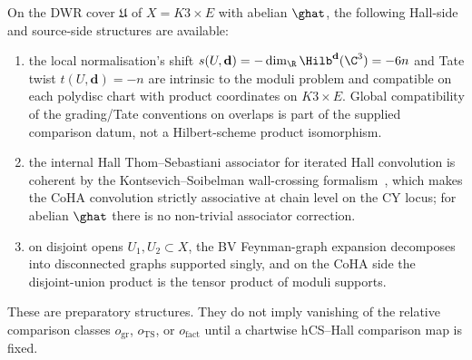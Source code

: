 \begin{proposition}
\label{prop:r6-grading-thom-sebastiani-fact-k3e-inscribed}
On the DWR cover $\mathfrak U$ of $X=K3\times E$ with abelian
$\ghat$, the following Hall-side and source-side structures are
available:
\begin{enumerate}
\item the local normalisation's shift
$s(U,\mathbf d)=-\dim_\R\Hilb^{\mathbf d}(\C^3)=-6n$ and Tate twist
$t(U,\mathbf d)=-n$ are intrinsic to the moduli problem and
compatible on each polydisc chart with product coordinates on
$K3\times E$. Global compatibility of the grading/Tate conventions on
overlaps is part of the supplied comparison datum, not a Hilbert-scheme
product isomorphism.
\item the internal Hall Thom--Sebastiani associator for iterated Hall
convolution is coherent by the Kontsevich--Soibelman
wall-crossing formalism~\cite{KS2008}, which makes the CoHA
convolution strictly associative at chain level on the CY locus; for
abelian $\ghat$ there is no non-trivial associator correction.
\item on disjoint opens $U_1,U_2\subset X$, the BV Feynman-graph
expansion decomposes into disconnected graphs supported singly, and on
the CoHA side the disjoint-union product is the tensor product of
moduli supports.
\end{enumerate}
These are preparatory structures. They do not imply vanishing of the
relative comparison classes $o_{\mathrm{gr}}$, $o_{\mathrm{TS}}$, or
$o_{\mathrm{fact}}$ until a chartwise hCS--Hall comparison map is fixed.
\end{proposition}

